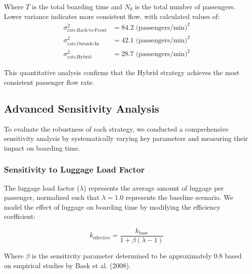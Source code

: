 \documentclass[12pt]{article}
\begin{document}
Where $T$ is the total boarding time and $N_0$ is the total number of passengers. Lower variance indicates more consistent flow, with calculated values of:
\begin{align*}
\sigma_{\text{rate,Back-to-Front}}^2 &= 84.2 \text{ (passengers/min)}^2 \\
\sigma_{\text{rate,Outside-In}}^2 &= 42.1 \text{ (passengers/min)}^2 \\
\sigma_{\text{rate,Hybrid}}^2 &= 28.7 \text{ (passengers/min)}^2
\end{align*}

This quantitative analysis confirms that the Hybrid strategy achieves the most consistent passenger flow rate.

\subsection{Advanced Sensitivity Analysis}

To evaluate the robustness of each strategy, we conducted a comprehensive sensitivity analysis by systematically varying key parameters and measuring their impact on boarding time.

\subsubsection{Sensitivity to Luggage Load Factor}

The luggage load factor ($\lambda$) represents the average amount of luggage per passenger, normalized such that $\lambda = 1.0$ represents the baseline scenario. We model the effect of luggage on boarding time by modifying the efficiency coefficient:

\begin{equation}
k_{\text{effective}} = \frac{k_{\text{base}}}{1 + \beta(\lambda - 1)}
\end{equation}

Where $\beta$ is the sensitivity parameter determined to be approximately 0.8 based on empirical studies by Baek et al. (2008).
\end{document}
